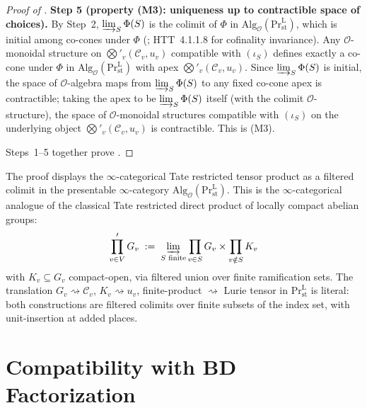 \begin{proof}[Proof of ]
\medskip\noindent\textbf{Step 5 (property (M3): uniqueness up to contractible space of choices).}
By Step~2, \(\varinjlim_{S}\Phi(S)\) is the colimit of \(\Phi\) in
\(\mathrm{Alg}_{\mathcal{O}}(\mathrm{Pr}^{\mathrm{L}}_{\mathrm{st}})\),
which is initial among co-cones under \(\Phi\)
(; HTT~4.1.1.8 for
cofinality invariance). Any \(\mathcal{O}\)-monoidal structure on
\(\bigotimes'_{v}(\mathcal{C}_{v},u_{v})\) compatible with
\((\iota_{S})\) defines exactly a co-cone under \(\Phi\) in
\(\mathrm{Alg}_{\mathcal{O}}(\mathrm{Pr}^{\mathrm{L}}_{\mathrm{st}})\)
with apex \(\bigotimes'_{v}(\mathcal{C}_{v},u_{v})\). Since
\(\varinjlim_{S}\Phi(S)\) is initial, the space of \(\mathcal{O}\)-algebra
maps from \(\varinjlim_{S}\Phi(S)\) to any fixed co-cone apex is
contractible; taking the apex to be \(\varinjlim_{S}\Phi(S)\) itself
(with the colimit \(\mathcal{O}\)-structure), the space of
\(\mathcal{O}\)-monoidal structures compatible with \((\iota_{S})\)
on the underlying object \(\bigotimes'_{v}(\mathcal{C}_{v},u_{v})\)
is contractible. This is (M3).

Steps~1--5 together prove .
\end{proof}

\begin{remark}
\label{v4-arith:tate:rem:cat-content}
The proof displays the \(\infty\)-categorical Tate restricted tensor
product as a filtered colimit in the presentable \(\infty\)-category
\(\mathrm{Alg}_{\mathcal{O}}(\mathrm{Pr}^{\mathrm{L}}_{\mathrm{st}})\).
This is the \(\infty\)-categorical analogue of the classical Tate
restricted direct product of locally compact abelian groups:
\[
\prod_{v\in V}^{\prime}G_{v}\;:=\;\varinjlim_{S\text{ finite}}\prod_{v\in S}G_{v}\times\prod_{v\notin S}K_{v}
\]
with \(K_{v}\subseteq G_{v}\) compact-open, via filtered union over
finite ramification sets. The translation
\(G_{v}\rightsquigarrow\mathcal{C}_{v}\),
\(K_{v}\rightsquigarrow u_{v}\), finite-product \(\rightsquigarrow\)
Lurie tensor in \(\mathrm{Pr}^{\mathrm{L}}_{\mathrm{st}}\) is literal:
both constructions are filtered colimits over finite subsets of
the index set, with unit-insertion at added places.
\end{remark}

\section{Compatibility with BD Factorization}
\label{v4-arith:tate:bd-factorization}


